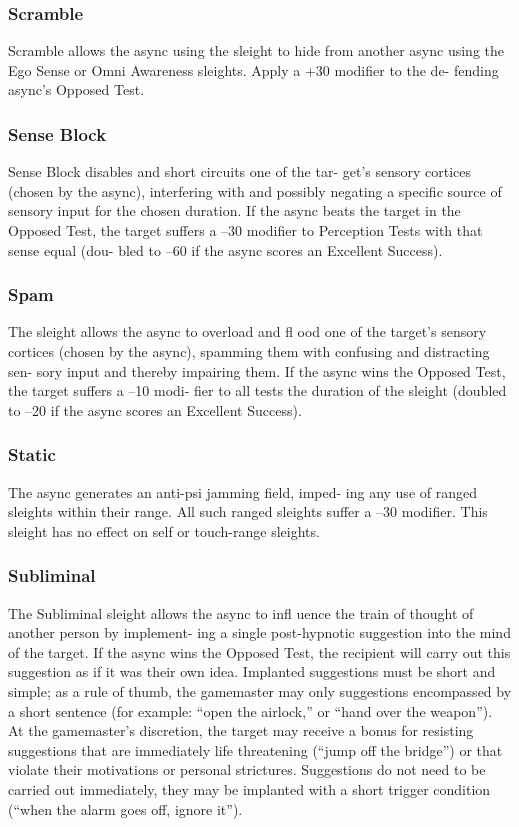\subsubsection{Scramble}

Scramble allows the async using the sleight to hide 
from another async using the Ego Sense or Omni 
Awareness sleights. Apply a +30 modifier to the de-
fending async's Opposed Test.

\subsubsection{Sense Block}

Sense Block disables and short circuits one of the tar-
get's sensory cortices (chosen by the async), interfering 
with and possibly negating a specific source of sensory 
input for the chosen duration. If the async beats the 
target in the Opposed Test, the target suffers a –30 
modifier to Perception Tests with that sense equal (dou-
bled to –60 if the async scores an Excellent Success).

\subsubsection{Spam}

The sleight allows the async to overload and fl ood one 
of the target's sensory cortices (chosen by the async), 
spamming them with confusing and distracting sen-
sory input and thereby impairing them. If the async 
wins the Opposed Test, the target suffers a –10 modi-
fier to all tests the duration of the sleight (doubled to 
–20 if the async scores an Excellent Success).

\subsubsection{Static}

The async generates an anti-psi jamming field, imped-
ing any use of ranged sleights within their range. All 
such ranged sleights suffer a –30 modifier. This sleight 
has no effect on self or touch-range sleights. 

\subsubsection{Subliminal}

The Subliminal sleight allows the async to infl uence 
the train of thought of another person by implement-
ing a single post-hypnotic suggestion into the mind 
of the target. If the async wins the Opposed Test, the 
recipient will carry out this suggestion as if it was 
their own idea. Implanted suggestions must be short 
and simple; as a rule of thumb, the gamemaster may 
only suggestions encompassed by a short sentence 
(for example: ``open the airlock,'' or ``hand over the 
weapon''). At the gamemaster's discretion, the target 
may receive a bonus for resisting suggestions that are 
immediately life threatening (``jump off the bridge'') 
or that violate their motivations or personal strictures. 
Suggestions do not need to be carried out immediately, 
they may be implanted with a short trigger condition 
(``when the alarm goes off, ignore it'').

